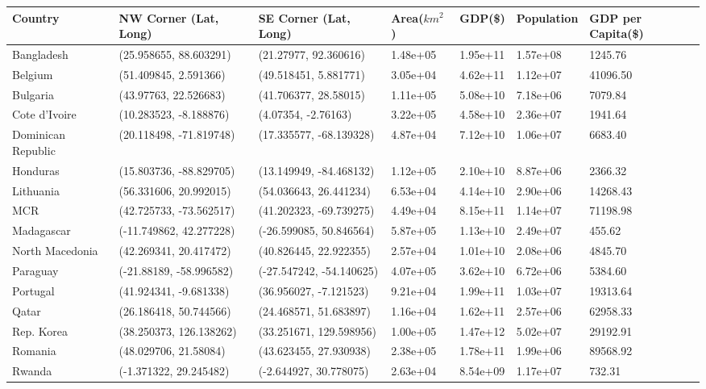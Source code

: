\begin{table*}[h!]
\centering
\begin{tabular}{lllllll}
\hline\hline
Country & NW Corner (Lat, Long) & SE Corner (Lat, Long) & Area($km^2$) & GDP(\$) & Population & GDP per Capita(\$) \\
\hline
Bangladesh & (25.958655, 88.603291) & (21.27977, 92.360616) & 1.48e+05 & 1.95e+11 & 1.57e+08 & 1245.76 \\
Belgium & (51.409845, 2.591366) & (49.518451, 5.881771) & 3.05e+04 & 4.62e+11 & 1.12e+07 & 41096.50 \\
Bulgaria & (43.97763, 22.526683) & (41.706377, 28.58015) & 1.11e+05 & 5.08e+10 & 7.18e+06 & 7079.84 \\
Cote d'Ivoire & (10.283523, -8.188876) & (4.07354, -2.76163) & 3.22e+05 & 4.58e+10 & 2.36e+07 & 1941.64 \\
Dominican Republic & (20.118498, -71.819748) & (17.335577, -68.139328) & 4.87e+04 & 7.12e+10 & 1.06e+07 & 6683.40 \\
Honduras & (15.803736, -88.829705) & (13.149949, -84.468132) & 1.12e+05 & 2.10e+10 & 8.87e+06 & 2366.32 \\
Lithuania & (56.331606, 20.992015) & (54.036643, 26.441234) & 6.53e+04 & 4.14e+10 & 2.90e+06 & 14268.43 \\
MCR & (42.725733, -73.562517) & (41.202323, -69.739275) & 4.49e+04 & 8.15e+11 & 1.14e+07 & 71198.98 \\
Madagascar & (-11.749862, 42.277228) & (-26.599085, 50.846564) & 5.87e+05 & 1.13e+10 & 2.49e+07 & 455.62 \\
North Macedonia & (42.269341, 20.417472) & (40.826445, 22.922355) & 2.57e+04 & 1.01e+10 & 2.08e+06 & 4845.70 \\
Paraguay & (-21.88189, -58.996582) & (-27.547242, -54.140625) & 4.07e+05 & 3.62e+10 & 6.72e+06 & 5384.60 \\
Portugal & (41.924341, -9.681338) & (36.956027, -7.121523) & 9.21e+04 & 1.99e+11 & 1.03e+07 & 19313.64 \\
Qatar & (26.186418, 50.744566) & (24.468571, 51.683897) & 1.16e+04 & 1.62e+11 & 2.57e+06 & 62958.33 \\
Rep. Korea & (38.250373, 126.138262) & (33.251671, 129.598956) & 1.00e+05 & 1.47e+12 & 5.02e+07 & 29192.91 \\
Romania & (48.029706, 21.58084) & (43.623455, 27.930938) & 2.38e+05 & 1.78e+11 & 1.99e+06 & 89568.92 \\
Rwanda & (-1.371322, 29.245482) & (-2.644927, 30.778075) & 2.63e+04 & 8.54e+09 & 1.17e+07 & 732.31 \\

\end{tabular}
\end{table*}
